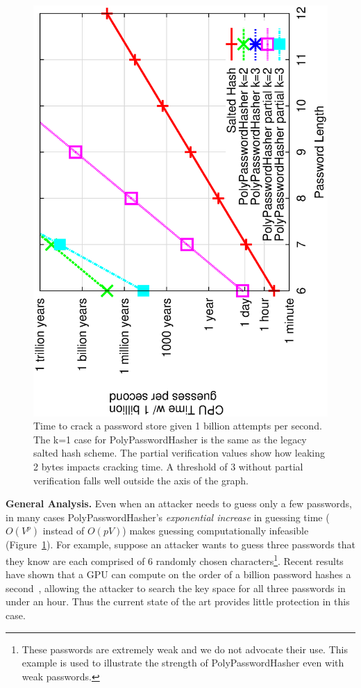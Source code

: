 \begin{figure}[t]
\hspace{-4mm}
\includegraphics[width=.36\textwidth, angle=270]{resultdata/plotcrack.eps}
	\caption{Time to crack a password store given 1 billion attempts
per second.   The k=1 case for PolyPasswordHasher is the same as the
legacy salted hash scheme.   The partial verification values show 
how leaking 2 bytes impacts cracking time.   A threshold of 3 without partial 
verification falls well outside the axis of the graph.}
	\label{fig:cracktime}  
\end{figure}


{\bf General Analysis.}
Even when an attacker needs to guess only a few passwords, in many cases 
PolyPasswordHasher's \emph{exponential increase} in guessing time ($O(V^p)$ instead 
of $O(pV)$) makes guessing computationally infeasible 
(Figure~\ref{fig:cracktime}).   For example, suppose 
an attacker wants to guess three passwords that they know are each comprised 
of 6 randomly chosen characters\footnote{These passwords
are extremely weak and we do not advocate their use.   This 
example is used to illustrate the strength of PolyPasswordHasher even with 
weak passwords.}.  Recent results 
have shown that a GPU can compute on the order of a billion password hashes a 
second~\cite{ElcomSoftGPUCracking, zonenberg2009distributed}, allowing the 
attacker to search the key space for all three passwords in under an hour.
Thus the current state of the art provides little protection in this case.

